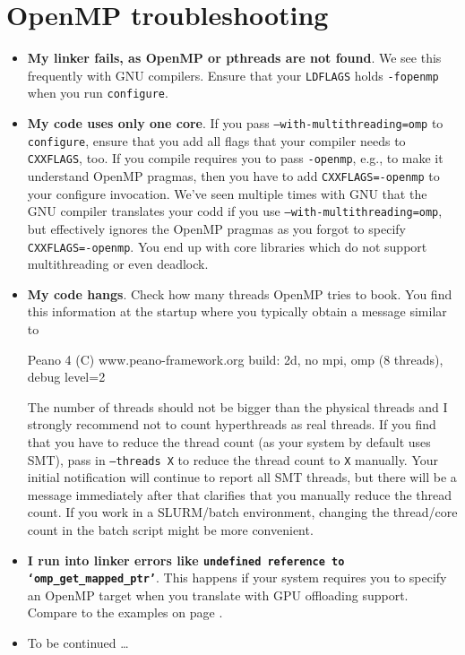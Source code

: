 \section{OpenMP troubleshooting}
\begin{itemize}
  \item \textbf{My linker fails, as OpenMP or pthreads are not found}. We see
  this frequently with GNU compilers. Ensure that your \texttt{LDFLAGS} holds
  \texttt{-fopenmp} when you run \texttt{configure}.
  \item \textbf{My code uses only one core}. If you pass
  \texttt{--with-multithreading=omp} to \texttt{configure}, ensure that you add
  all flags that your compiler needs to \texttt{CXXFLAGS}, too. If you compile
  requires you to pass \texttt{-openmp}, e.g., to make it understand OpenMP
  pragmas, then you have to add \texttt{CXXFLAGS=-openmp} to your configure
  invocation. We've seen multiple times with GNU that the GNU compiler
  translates your codd if you use \texttt{--with-multithreading=omp}, but
  effectively ignores the OpenMP pragmas as you forgot to specify
  \texttt{CXXFLAGS=-openmp}. You end up with core libraries which do not support
  multithreading or even deadlock.
  \item \textbf{My code hangs}. Check how many threads OpenMP tries to book. You
  find this information at the startup where you typically obtain a message
  similar to 
  \begin{terminalOutput}
Peano 4 (C) www.peano-framework.org 
build: 2d, no mpi, omp (8 threads), debug level=2
  \end{terminalOutput}
  The number of threads should not be bigger than the physical threads and I
  strongly recommend not to count hyperthreads as real threads. If you find that
  you have to reduce the thread count (as your system by default uses SMT), pass
  in \texttt{--threads X} to reduce the thread count to \texttt{X} manually.
  Your initial notification will continue to report all SMT threads, but there
  will be a message immediately after that clarifies that you manually reduce
  the thread count. If you work in a SLURM/batch environment, changing the
  thread/core count in the batch script might be more convenient.
  \item {\bf I run into linker errors like \texttt{undefined reference to
  `omp\_get\_mapped\_ptr'}}. This happens if your system requires you to specify
  an OpenMP target when you translate with GPU offloading support. Compare to
  the examples on page \pageref{section:supercomputers:openmp}.
  \item To be continued \dots
\end{itemize}




